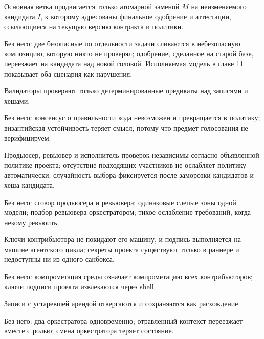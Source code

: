 \begin{invbox}
Основная ветка продвигается только атомарной заменой $M$ на неизменяемого кандидата $I$, к которому адресованы финальное одобрение и аттестации, ссылающиеся на текущую версию контракта и политики.

Без него: две безопасные по отдельности задачи сливаются в небезопасную композицию, которую никто не проверял; одобрение, сделанное на старой базе, переезжает на кандидата над новой головой. Исполняемая модель в главе 11 показывает оба сценария как нарушения.
\end{invbox}

\begin{invbox}
Валидаторы проверяют только детерминированные предикаты над записями и хешами.

Без него: консенсус о правильности кода невозможен и превращается в политику; византийская устойчивость теряет смысл, потому что предмет голосования не верифицируем.
\end{invbox}

\begin{invbox}
Продьюсер, ревьювер и исполнитель проверок независимы согласно объявленной политике проекта; отсутствие подходящих участников не ослабляет политику автоматически; случайность выбора фиксируется после заморозки кандидатов и хеша кандидата.

Без него: сговор продьюсера и ревьювера; одинаковые слепые зоны одной модели; подбор ревьювера оркестратором; тихое ослабление требований, когда некому ревьюить.
\end{invbox}

\begin{invbox}
Ключи контрибьютора не покидают его машину, и подпись выполняется на машине агентского цикла; секреты проекта существуют только в раннере и недоступны ни из одного санбокса.

Без него: компрометация среды означает компрометацию всех контрибьюторов; ключи подписи проекта извлекаются через shell.
\end{invbox}

\begin{invbox}
Записи с устаревшей арендой отвергаются и сохраняются как расхождение.

Без него: два оркестратора одновременно; отравленный контекст переезжает вместе с ролью; смена оркестратора теряет состояние.
\end{invbox}


